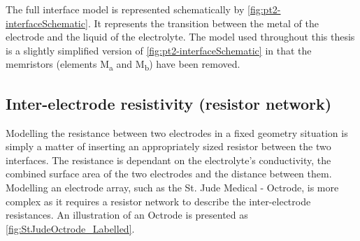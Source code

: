   The full interface model is represented schematically by \cref{fig:pt2-interfaceSchematic}.
  It represents the transition between the metal of the electrode and the liquid of the electrolyte.
  The model used throughout this thesis is a slightly simplified version of \cref{fig:pt2-interfaceSchematic} in that the memristors (elements M\textsubscript{a} and M\textsubscript{b}) have been removed.





  \subsection{Inter-electrode resistivity (resistor network)}


    Modelling the resistance between two electrodes in a fixed geometry situation is simply a matter of inserting an appropriately sized resistor between the two interfaces.
    The resistance is dependant on the electrolyte's conductivity, the combined surface area of the two electrodes and the distance between them.
    Modelling an electrode array, such as the St. Jude Medical - Octrode, is more complex as it requires a resistor network to describe the inter-electrode resistances.
    An illustration of an Octrode is presented as \cref{fig:StJudeOctrode_Labelled}.

